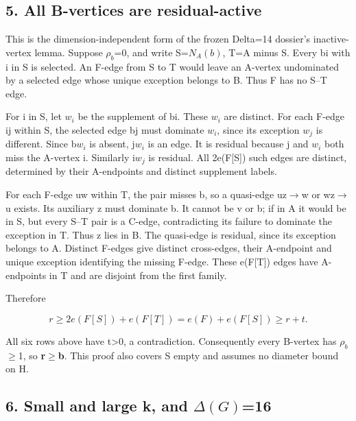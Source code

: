 \documentclass[
  11pt,
]{article}
\begin{document}
\hypertarget{all-b-vertices-are-residual-active}{%
\subsection{5. All B-vertices are
residual-active}\label{all-b-vertices-are-residual-active}}

This is the dimension-independent form of the frozen Delta=14 dossier's
inactive-vertex lemma. Suppose \ensuremath{\rho _b}=0, and write
S=\ensuremath{N_A(b)}, T=A minus S. Every bi with i in S is selected. An
F-edge from S to T would leave an A-vertex undominated by a selected
edge whose unique exception belongs to B. Thus F has no S--T edge.

For i in S, let \ensuremath{w_i} be the supplement of bi. These
\ensuremath{w_i} are distinct. For each F-edge ij within S, the selected
edge bj must dominate \ensuremath{w_i}, since its exception
\ensuremath{w_j} is different. Since b\ensuremath{w_i} is absent,
j\ensuremath{w_i} is an edge. It is residual because j and
\ensuremath{w_i} both miss the A-vertex i. Similarly i\ensuremath{w_j}
is residual. All 2e(F{[}S{]}) such edges are distinct, determined by
their A-endpoints and distinct supplement labels.

For each F-edge uw within T, the pair misses b, so a quasi-edge
uz\ensuremath{\to}w or wz\ensuremath{\to}u exists. Its auxiliary z must
dominate b. It cannot be v or b; if in A it would be in S, but every
S--T pair is a C-edge, contradicting its failure to dominate the
exception in T. Thus z lies in B. The quasi-edge is residual, since its
exception belongs to A. Distinct F-edges give distinct cross-edges,
their A-endpoint and unique exception identifying the missing F-edge.
These e(F{[}T{]}) edges have A-endpoints in T and are disjoint from the
first family.

Therefore

\[
r\ge2e(F[S])+e(F[T])=e(F)+e(F[S])\ge r+t.
\]

All six rows above have t\textgreater0, a contradiction. Consequently
every B-vertex has \ensuremath{\rho _b}\ensuremath{\ge}1, so
\textbf{r\ensuremath{\ge}b}. This proof also covers S empty and assumes
no diameter bound on H.

\hypertarget{small-and-large-k-and-16}{%
\subsection{\texorpdfstring{6. Small and large k, and
\ensuremath{\Delta (G)}=16}{6. Small and large k, and =16}}\label{small-and-large-k-and-16}}
\end{document}
